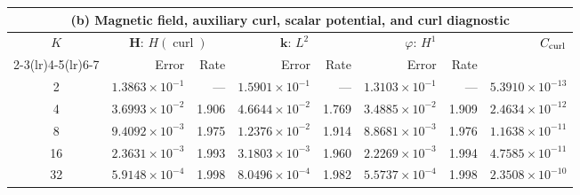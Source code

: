 \documentclass[11pt,a4paper]{article}
\newcommand{\bs}{\boldsymbol}
\DeclareMathOperator{\curl}{curl}
\theoremstyle{definition}
\numberwithin{equation}{section}
\begin{document}
\begin{table}[H]
\begin{tabular}{@{}c*{8}{r}@{}}
\bottomrule
\end{tabular}
\par\medskip
\begin{tabular}{@{}c*{7}{r}@{}}
\toprule
\multicolumn{8}{c}{(b) Magnetic field, auxiliary curl, scalar potential, and curl diagnostic}\\
\midrule
$K$ & \multicolumn{2}{c}{$\bs H$: $H(\curl)$} & \multicolumn{2}{c}{$\bs k$: $L^2$} & \multicolumn{2}{c}{$\varphi$: $H^1$} & $C_{\rm curl}$\\
\cmidrule(lr){2-3}\cmidrule(lr){4-5}\cmidrule(lr){6-7}
 & Error & Rate & Error & Rate & Error & Rate & \\
\midrule
2 & $1.3863\!\times\!10^{-1}$ & --- & $1.5901\!\times\!10^{-1}$ & --- & $1.3103\!\times\!10^{-1}$ & --- & $5.3910\!\times\!10^{-13}$\\
4 & $3.6993\!\times\!10^{-2}$ & 1.906 & $4.6644\!\times\!10^{-2}$ & 1.769 & $3.4885\!\times\!10^{-2}$ & 1.909 & $2.4634\!\times\!10^{-12}$\\
8 & $9.4092\!\times\!10^{-3}$ & 1.975 & $1.2376\!\times\!10^{-2}$ & 1.914 & $8.8681\!\times\!10^{-3}$ & 1.976 & $1.1638\!\times\!10^{-11}$\\
16 & $2.3631\!\times\!10^{-3}$ & 1.993 & $3.1803\!\times\!10^{-3}$ & 1.960 & $2.2269\!\times\!10^{-3}$ & 1.994 & $4.7585\!\times\!10^{-11}$\\
32 & $5.9148\!\times\!10^{-4}$ & 1.998 & $8.0496\!\times\!10^{-4}$ & 1.982 & $5.5737\!\times\!10^{-4}$ & 1.998 & $2.3508\!\times\!10^{-10}$\\
\bottomrule
\end{tabular}
\endgroup
\end{table}
\end{document}
